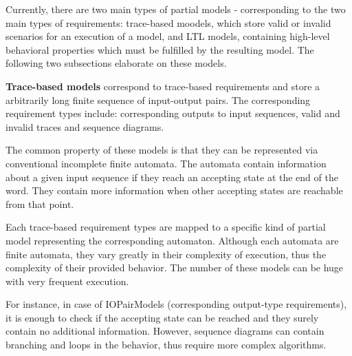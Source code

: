 Currently, there are two main types of partial models - corresponding to the two main types of requirements: trace-based moodels, which store valid or invalid scenarios for an execution of a model, and LTL models, containing high-level behavioral properties which must be fulfilled by the resulting model. The following two subsections elaborate on these models. 


\textbf{Trace-based models} correspond to trace-based requirements and store a arbitrarily long finite sequence of input-output pairs. The corresponding requirement types include: corresponding outputs to input sequences, valid and invalid traces and sequence diagrams. 

The common property of these models is that they can be represented via conventional incomplete finite automata. The automata contain information about a given input sequence if they reach an accepting state at the end of the word. They contain more information when other accepting states are reachable from that point.

Each trace-based requirement types are mapped to a specific kind of partial model representing the corresponding automaton. Although each automata are finite automata, they vary greatly in their complexity of execution, thus the complexity of their provided behavior. The number of these models can be huge with very frequent execution.

For instance, in case of IOPairModels (corresponding output-type requirements), it is enough to check if the accepting state can be reached and they surely contain no additional information. However, sequence diagrams can contain branching and loops in the behavior, thus require more complex algorithms.


